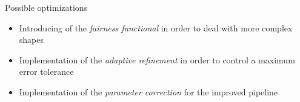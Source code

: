 %

\begin{frame}{Possible optimizations}
\begin{itemize}
\item Introducing of the \textit{fairness functional} in order to deal with more complex shapes
\item Implementation of the \textit{adaptive refinement} in order to control a maximum error tolerance
\item Implementation of the \textit{parameter correction} for the improved pipeline
\end{itemize}
\end{frame}